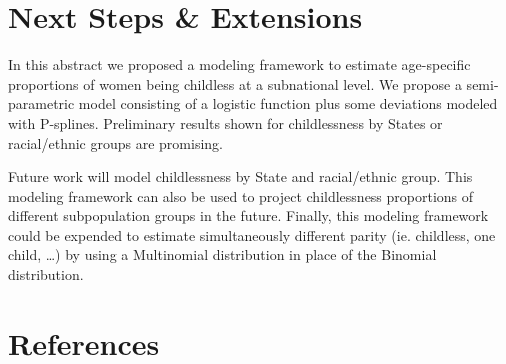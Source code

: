 \documentclass[
  11pt,
  letterpaper,
]{article}
\begin{document}
\hypertarget{next-steps-extensions}{%
\section{Next Steps \& Extensions}\label{next-steps-extensions}}

In this abstract we proposed a modeling framework to estimate age-specific proportions of women being childless at a subnational level. We propose a semi-parametric model consisting of a logistic function plus some deviations modeled with P-splines. Preliminary results shown for childlessness by States or racial/ethnic groups are promising.

Future work will model childlessness by State and racial/ethnic group. This modeling framework can also be used to project childlessness proportions of different subpopulation groups in the future. Finally, this modeling framework could be expended to estimate simultaneously different parity (ie. childless, one child, \ldots) by using a Multinomial distribution in place of the Binomial distribution.

\newpage

\hypertarget{references}{%
\section*{References}\label{references}}
\end{document}
